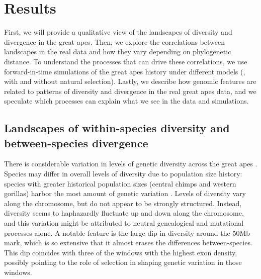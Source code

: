 \section{Results}

First, we will provide a qualitative view of the landscapes of diversity and divergence in the great apes.
Then, we explore the correlations between landscapes in the real data and how they vary depending on phylogenetic distance.
To understand the processes that can drive these correlations, we use forward-in-time simulations of the great apes history under different models (\eg, with and without natural selection).
Lastly, we describe how genomic features are related to patterns of diversity and divergence in the real great apes data,
and we speculate which processes can explain what we see in the data and simulations.


\subsection{Landscapes of within-species diversity and between-species divergence}

There is considerable variation in levels of genetic diversity across the great apes .
Species may differ in overall levels of diversity due to population size history: 
species with greater historical population sizes (\eg central chimps and western gorillas) harbor the most amount of genetic variation \citep{prado-martinez_great_2013}.
Levels of diversity vary along the chromosome, but do not appear to be strongly structured.
Instead, diversity seems to haphazardly fluctuate up and down along the chromosome,
and this variation might be attributed to neutral genealogical and mutational processes alone.
A notable feature is the large dip in diversity around the 50Mb mark,
which is so extensive that it almost erases the differences between-species.
This dip coincides with three of the windows with the highest exon density,
possibly pointing to the role of selection in shaping genetic variation in those windows.

